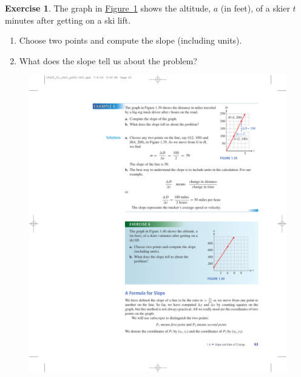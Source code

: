 \documentclass[10pt,]{book}
\theoremstyle{plain}
\theoremstyle{definition}
\theoremstyle{definition}
\theoremstyle{definition}
\theoremstyle{definition}
\newtheorem{exercise}[theorem]{Exercise}
\numberwithin{equation}{part}
\begin{document}
\begin{exercise}\label{example-ski-lift}
The graph in \hyperref[fig-ski-lift]{Figure~\ref{fig-ski-lift}} shows the altitude, \(a\) (in feet), of a skier \(t\) minutes after getting on a ski lift. \leavevmode%
\begin{enumerate}[label=*\alph**]
\item\hypertarget{li-891}{}Choose two points and compute the slope (including units).%
\item\hypertarget{li-892}{}What does the slope tell us about the problem?%
\end{enumerate}
 \begin{figure}
\centering
\includegraphics[width=0.6\linewidth]{images/fig-ski-lift}
\caption{\label{fig-ski-lift}}
\end{figure}
%
\end{exercise}
\typeout{************************************************}
\typeout{************************************************}
\end{document}
